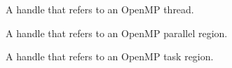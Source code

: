 \glossarydefstart
A handle that refers to an OpenMP thread.
\glossarydefend

\glossarydefstart
A handle that refers to an OpenMP parallel region.
\glossarydefend

\glossarydefstart
A handle that refers to an OpenMP task region.
\glossarydefend

